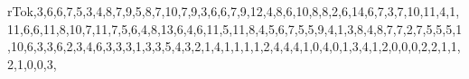 \documentclass[
  10pt,
  a4paper,
,tablecaptionabove
]{scrartcl}
\newenvironment{Shaded}{}{}
\newcommand{\DecValTok}[1]{\textcolor[rgb]{0.25,0.63,0.44}{#1}}
\newcommand{\OtherTok}[1]{\textcolor[rgb]{0.00,0.44,0.13}{#1}}
\begin{document}
\begin{Shaded}
\begin{Highlighting}[]
rTok{,}\DecValTok{3}\OtherTok{,}\DecValTok{6}\OtherTok{,}\DecValTok{6}\OtherTok{,}\DecValTok{7}\OtherTok{,}\DecValTok{5}\OtherTok{,}\DecValTok{3}\OtherTok{,}\DecValTok{4}\OtherTok{,}\DecValTok{8}\OtherTok{,}\DecValTok{7}\OtherTok{,}\DecValTok{9}\OtherTok{,}\DecValTok{5}\OtherTok{,}\DecValTok{8}\OtherTok{,}\DecValTok{7}\OtherTok{,}\DecValTok{10}\OtherTok{,}\DecValTok{7}\OtherTok{,}\DecValTok{9}\OtherTok{,}\DecValTok{3}\OtherTok{,}\DecValTok{6}\OtherTok{,}\DecValTok{6}\OtherTok{,}\DecValTok{7}\OtherTok{,}\DecValTok{9}\OtherTok{,}\DecValTok{12}\OtherTok{,}\DecValTok{4}\OtherTok{,}\DecValTok{8}\OtherTok{,}\DecValTok{6}\OtherTok{,}\DecValTok{10}\OtherTok{,}\DecValTok{8}\OtherTok{,}\DecValTok{8}\OtherTok{,}\DecValTok{2}\OtherTok{,}\DecValTok{6}\OtherTok{,}\DecValTok{14}\OtherTok{,}\DecValTok{6}\OtherTok{,}\DecValTok{7}\OtherTok{,}\DecValTok{3}\OtherTok{,}\DecValTok{7}\OtherTok{,}\DecValTok{10}\OtherTok{,}\DecValTok{11}\OtherTok{,}\DecValTok{4}\OtherTok{,}\DecValTok{1}\OtherTok{,}\DecValTok{11}\OtherTok{,}\DecValTok{6}\OtherTok{,}\DecValTok{6}\OtherTok{,}\DecValTok{11}\OtherTok{,}\DecValTok{8}\OtherTok{,}\DecValTok{10}\OtherTok{,}\DecValTok{7}\OtherTok{,}\DecValTok{11}\OtherTok{,}\DecValTok{7}\OtherTok{,}\DecValTok{5}\OtherTok{,}\DecValTok{6}\OtherTok{,}\DecValTok{4}\OtherTok{,}\DecValTok{8}\OtherTok{,}\DecValTok{13}\OtherTok{,}\DecValTok{6}\OtherTok{,}\DecValTok{4}\OtherTok{,}\DecValTok{6}\OtherTok{,}\DecValTok{11}\OtherTok{,}\DecValTok{5}\OtherTok{,}\DecValTok{11}\OtherTok{,}\DecValTok{8}\OtherTok{,}\DecValTok{4}\OtherTok{,}\DecValTok{5}\OtherTok{,}\DecValTok{6}\OtherTok{,}\DecValTok{7}\OtherTok{,}\DecValTok{5}\OtherTok{,}\DecValTok{5}\OtherTok{,}\DecValTok{9}\OtherTok{,}\DecValTok{4}\OtherTok{,}\DecValTok{1}\OtherTok{,}\DecValTok{3}\OtherTok{,}\DecValTok{8}\OtherTok{,}\DecValTok{4}\OtherTok{,}\DecValTok{8}\OtherTok{,}\DecValTok{7}\OtherTok{,}\DecValTok{7}\OtherTok{,}\DecValTok{2}\OtherTok{,}\DecValTok{7}\OtherTok{,}\DecValTok{5}\OtherTok{,}\DecValTok{5}\OtherTok{,}\DecValTok{5}\OtherTok{,}\DecValTok{1}\OtherTok{,}\DecValTok{10}\OtherTok{,}\DecValTok{6}\OtherTok{,}\DecValTok{3}\OtherTok{,}\DecValTok{3}\OtherTok{,}\DecValTok{6}\OtherTok{,}\DecValTok{2}\OtherTok{,}\DecValTok{3}\OtherTok{,}\DecValTok{4}\OtherTok{,}\DecValTok{6}\OtherTok{,}\DecValTok{3}\OtherTok{,}\DecValTok{3}\OtherTok{,}\DecValTok{3}\OtherTok{,}\DecValTok{1}\OtherTok{,}\DecValTok{3}\OtherTok{,}\DecValTok{3}\OtherTok{,}\DecValTok{5}\OtherTok{,}\DecValTok{4}\OtherTok{,}\DecValTok{3}\OtherTok{,}\DecValTok{2}\OtherTok{,}\DecValTok{1}\OtherTok{,}\DecValTok{4}\OtherTok{,}\DecValTok{1}\OtherTok{,}\DecValTok{1}\OtherTok{,}\DecValTok{1}\OtherTok{,}\DecValTok{1}\OtherTok{,}\DecValTok{2}\OtherTok{,}\DecValTok{4}\OtherTok{,}\DecValTok{4}\OtherTok{,}\DecValTok{4}\OtherTok{,}\DecValTok{1}\OtherTok{,}\DecValTok{0}\OtherTok{,}\DecValTok{4}\OtherTok{,}\DecValTok{0}\OtherTok{,}\DecValTok{1}\OtherTok{,}\DecValTok{3}\OtherTok{,}\DecValTok{4}\OtherTok{,}\DecValTok{1}\OtherTok{,}\DecValTok{2}\OtherTok{,}\DecValTok{0}\OtherTok{,}\DecValTok{0}\OtherTok{,}\DecValTok{0}\OtherTok{,}\DecValTok{2}\OtherTok{,}\DecValTok{2}\OtherTok{,}\DecValTok{1}\OtherTok{,}\DecValTok{1}\OtherTok{,}\DecValTok{2}\OtherTok{,}\DecValTok{1}\OtherTok{,}\DecValTok{0}\OtherTok{,}\DecValTok{0}\OtherTok{,}\DecValTok{3}\OtherTok{,}\D
\end{Highlighting}
\end{Shaded}
\end{document}
